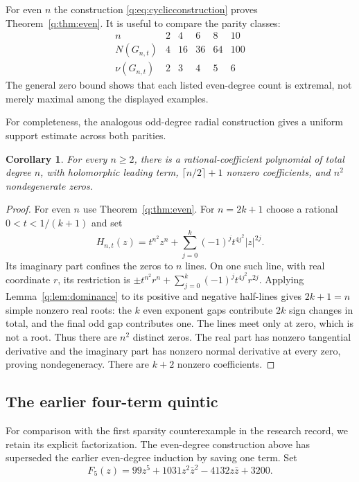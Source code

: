 \documentclass[UTF8,11pt]{ctexart}
\newtheorem{cor}[thm]{Corollary}
\theoremstyle{definition}
\numberwithin{equation}{section}
\begin{document}
For even $n$ the construction \eqref{q:eq:cyclicconstruction} proves
Theorem~\ref{q:thm:even}. It is useful to compare the parity classes:
\[
\begin{array}{c|ccccc}
 n&2&4&6&8&10\\ \hline
 N(G_{n,t})&4&16&36&64&100\\
 \nu(G_{n,t})&2&3&4&5&6
\end{array}
\]
The general zero bound shows that each listed even-degree count is
extremal, not merely maximal among the displayed examples.

For completeness, the analogous odd-degree radial construction gives a
uniform support estimate across both parities.
\begin{cor}\label{q:cor:supportall}
For every $n\ge2$, there is a rational-coefficient polynomial of total
degree $n$, with holomorphic leading term,
$\lceil n/2\rceil+1$ nonzero coefficients, and $n^2$ nondegenerate zeros.
\end{cor}
\begin{proof}
For even $n$ use Theorem~\ref{q:thm:even}. For $n=2k+1$ choose a rational
$0<t<1/(k+1)$ and set
\[
 H_{n,t}(z)=t^{n^2}z^n+
     \sum_{j=0}^k(-1)^jt^{4j^2}|z|^{2j}.
\]
Its imaginary part confines the zeros to $n$ lines. On one such line,
with real coordinate $r$, its restriction is
$\pm t^{n^2}r^n+\sum_{j=0}^k(-1)^jt^{4j^2}r^{2j}$.
Applying Lemma~\ref{q:lem:dominance} to its positive and negative
half-lines gives $2k+1=n$ simple nonzero real roots: the $k$ even
exponent gaps contribute $2k$ sign changes in total, and the final odd
gap contributes one. The lines meet only at zero, which is not a root.
Thus there are $n^2$ distinct zeros. The real part has nonzero tangential
derivative and the imaginary part has nonzero normal derivative at
every zero, proving nondegeneracy. There are $k+2$ nonzero coefficients.
\end{proof}


\subsection{The earlier four-term quintic}\label{v:sec:five}
For comparison with the first sparsity counterexample in the research
record, we retain its explicit factorization. The even-degree construction
above has superseded the earlier even-degree induction by saving one term.
Set
\begin{equation}\label{v:eq:quintic}
 F_5(z)=99z^5+1031z^2\bar z^2-4132z\bar z+3200.
\end{equation}
\end{document}
